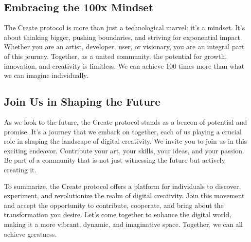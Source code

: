 \documentclass[12pt,a4paper]{article}
\begin{document}
\subsection*{Embracing the 100x Mindset}

The Create protocol is more than just a technological marvel; it's a mindset. It's about thinking bigger, pushing boundaries, and striving for exponential impact. Whether you are an artist, developer, user, or visionary, you are an integral part of this journey. Together, as a united community, the potential for growth, innovation, and creativity is limitless. We can achieve 100 times more than what we can imagine individually.

\subsection*{Join Us in Shaping the Future}

As we look to the future, the Create protocol stands as a beacon of potential and promise. It's a journey that we embark on together, each of us playing a crucial role in shaping the landscape of digital creativity. We invite you to join us in this exciting endeavor. Contribute your art, your skills, your ideas, and your passion. Be part of a community that is not just witnessing the future but actively creating it.

To summarize, the Create protocol offers a platform for individuals to discover, experiment, and revolutionize the realm of digital creativity. Join this movement and accept the opportunity to contribute, cooperate, and bring about the transformation you desire. Let's come together to enhance the digital world, making it a more vibrant, dynamic, and imaginative space. Together, we can all achieve greatness.
\end{document}
